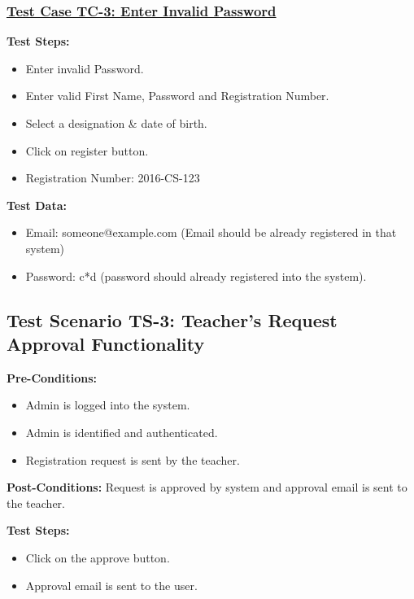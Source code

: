 \subsubsection{\underline{Test Case TC-3: Enter Invalid Password}}
\textbf{Test Steps:}
\begin{itemize}

\item Enter invalid Password.
\item Enter valid First Name, Password and Registration Number.
\item Select a designation \& date of birth.
\item Click on register button.
\item Registration Number: 2016-CS-123

\end{itemize}

\textbf{Test Data:}
\begin{itemize}

\item Email: someone@example.com (Email should be already registered in that system)
\item Password: c*d (password should already registered into the system).

\end{itemize}




\subsection{Test Scenario TS-3: Teacher's Request Approval Functionality}
\textbf{Pre-Conditions: }
\begin{itemize}

\item Admin is logged into the system.
\item Admin is identified and authenticated.
\item Registration request is sent by the teacher.

\end{itemize}
\textbf{Post-Conditions: } Request is approved by system and approval email is sent to the teacher. 

\textbf{Test Steps:}
\begin{itemize}

\item Click on the approve button.
\item Approval email is sent to the user.

\end{itemize}


